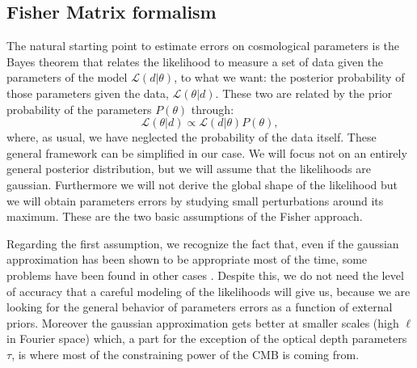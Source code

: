 \documentclass[aps,prd,preprint,groupedaddress]{revtex4-1}
\begin{document}
\subsection{Fisher Matrix formalism \label{subsec:fm-formalism}}
The natural starting point to estimate errors on cosmological parameters is the Bayes theorem that relates the likelihood to measure a set of data given the parameters of the model $\mathcal{L}(d|\theta)$, to what we want: the posterior probability of those parameters given the data, $\mathcal{L}(\theta|d)$.
These two are related by the prior probability of the parameters $P(\theta)$ through:
\begin{equation}
\mathcal{L}(\theta|d)\propto \mathcal{L}(d|\theta)P(\theta),
\end{equation}
where, as usual, we have neglected the probability of the data itself.
These general framework can be simplified in our case. We will focus not on an entirely general posterior distribution, but we will assume that the likelihoods are gaussian.
Furthermore we will not derive the global shape of the likelihood but we will obtain parameters errors by studying small perturbations around its maximum. These are the two basic assumptions of the Fisher approach.

Regarding the first assumption, we recognize the fact that, even if the gaussian approximation has been shown to be appropriate most of the time, some problems have been found in other cases \cite{2012JCAP...09..009W}. Despite this, we do not need the level of accuracy that a careful modeling of the likelihoods will give us, because we are looking for the general behavior of parameters errors as a function of external priors.
Moreover the gaussian approximation gets better at smaller scales (high $\ell$ in Fourier space) which, a part for the exception of the optical depth parameters $\tau$, is where most of the constraining power of the CMB is coming from.
\end{document}
